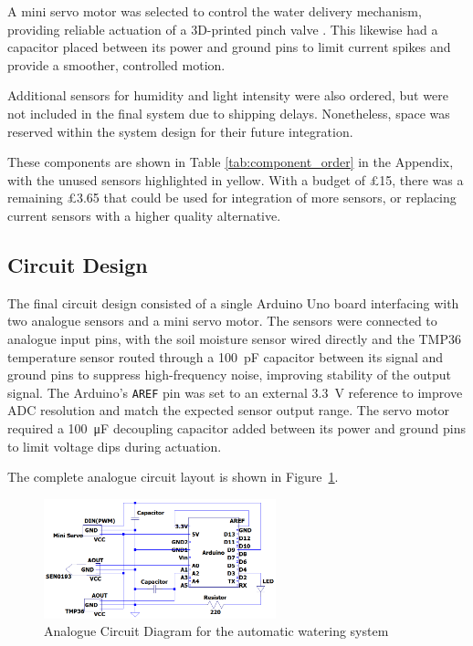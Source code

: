 \documentclass[a4paper,11pt]{article}
\begin{document}
A mini servo motor \cite{arduino_servo} was selected to control the water delivery mechanism, 
providing reliable actuation of a 3D-printed pinch valve \cite{pinch_valve_design}.
This likewise had a capacitor placed between its power and ground pins 
to limit current spikes and provide a smoother, controlled motion.

Additional sensors for humidity and light intensity were also ordered, 
but were not included in the final system due to shipping delays. 
Nonetheless, space was reserved within the system design 
for their future integration.

These components are shown in Table \ref{tab:component_order} in the Appendix,
with the unused sensors highlighted in yellow.
With a budget of £15, there was a remaining £3.65 
that could be used for integration of more sensors,
or replacing current sensors with a higher quality alternative.

\subsection{Circuit Design}
\label{sec:circuit_design}

The final circuit design consisted of a single Arduino Uno board interfacing 
with two analogue sensors and a mini servo motor. The sensors were connected 
to analogue input pins, with the soil moisture sensor wired directly and the 
TMP36 temperature sensor routed through a \SI{100}{\pico\farad} capacitor 
between its signal and ground pins to suppress high-frequency noise,
improving stability of the output signal. 
The Arduino's \texttt{AREF} pin was set to an external \SI{3.3}{\volt} reference 
to improve ADC resolution and match the expected sensor output range.
The servo motor required a \SI{100}{\micro\farad} decoupling capacitor added between 
its power and ground pins to limit voltage dips during actuation.

The complete analogue circuit layout is shown in 
Figure~\ref{fig:Analogue_Circuit_Diagram_for_the_automatic_watering_system}.

\begin{figure}[H]
    \centering
    \includegraphics[width=0.6\textwidth]{Analogue Circuit Diagram - final.png}
    \caption{Analogue Circuit Diagram for the automatic watering system}
    \label{fig:Analogue_Circuit_Diagram_for_the_automatic_watering_system}
\end{figure}
\end{document}
